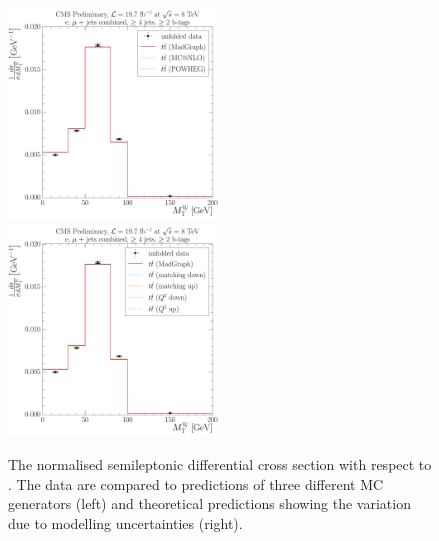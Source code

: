 \begin{figure}[!htbp]
	\centering
  	{\includegraphics[width=0.5\textwidth]{measurement/MT/central/normalised_xsection_combined_different_generators}}\hfill
  	{\includegraphics[width=0.5\textwidth]{measurement/MT/central/normalised_xsection_combined_systematics_shifts}}
    \caption[The normalised semileptonic \ttbar differential cross section with respect to \MT.]{The normalised
      semileptonic \ttbar differential cross section with respect to \MT. The data are compared to predictions of three
      different MC generators (left) and theoretical predictions showing the variation due to modelling uncertainties
      (right).}
    \label{fig:results_MT_combined}
\end{figure}

